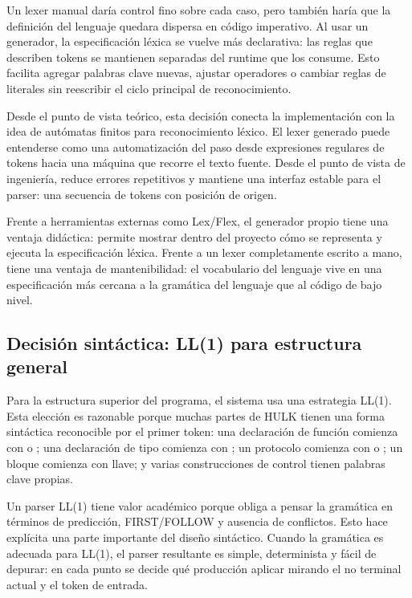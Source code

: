 \documentclass[12pt,letterpaper]{article}
\newcommand{\repo}[1]{\texttt{\detokenize{#1}}}
\newcommand{\hulk}{\textsc{HULK}}
\begin{document}
Un lexer manual daría control fino sobre cada caso, pero también haría que la definición del lenguaje quedara dispersa en código imperativo. Al usar un generador, la especificación léxica se vuelve más declarativa: las reglas que describen tokens se mantienen separadas del runtime que los consume. Esto facilita agregar palabras clave nuevas, ajustar operadores o cambiar reglas de literales sin reescribir el ciclo principal de reconocimiento.

Desde el punto de vista teórico, esta decisión conecta la implementación con la idea de autómatas finitos para reconocimiento léxico. El lexer generado puede entenderse como una automatización del paso desde expresiones regulares de tokens hacia una máquina que recorre el texto fuente. Desde el punto de vista de ingeniería, reduce errores repetitivos y mantiene una interfaz estable para el parser: una secuencia de tokens con posición de origen.

Frente a herramientas externas como Lex/Flex, el generador propio tiene una ventaja didáctica: permite mostrar dentro del proyecto cómo se representa y ejecuta la especificación léxica. Frente a un lexer completamente escrito a mano, tiene una ventaja de mantenibilidad: el vocabulario del lenguaje vive en una especificación más cercana a la gramática del lenguaje que al código de bajo nivel.

\subsection{Decisión sintáctica: LL(1) para estructura general}

Para la estructura superior del programa, el sistema usa una estrategia LL(1). Esta elección es razonable porque muchas partes de \hulk{} tienen una forma sintáctica reconocible por el primer token: una declaración de función comienza con \repo{function} o \repo{define}; una declaración de tipo comienza con \repo{type}; un protocolo comienza con \repo{protocol} o \repo{interface}; un bloque comienza con llave; y varias construcciones de control tienen palabras clave propias.

Un parser LL(1) tiene valor académico porque obliga a pensar la gramática en términos de predicción, FIRST/FOLLOW y ausencia de conflictos. Esto hace explícita una parte importante del diseño sintáctico. Cuando la gramática es adecuada para LL(1), el parser resultante es simple, determinista y fácil de depurar: en cada punto se decide qué producción aplicar mirando el no terminal actual y el token de entrada.
\end{document}
